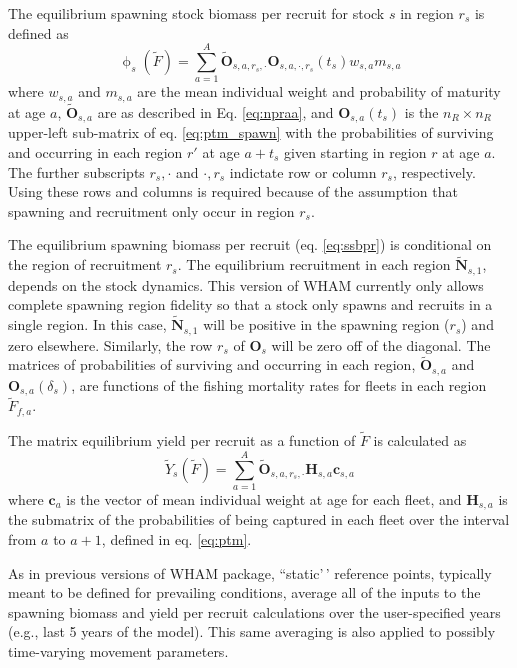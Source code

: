 \documentclass[
]{article}
\begin{document}
The equilibrium spawning stock biomass per recruit for stock \(s\) in
region \(r_s\) is defined as \begin{equation}\label{eq:ssbpr}
 \upphi_s(\widetilde{F}) = \sum^{A}_{a=1} \widetilde{\mathbf{O}}_{s,a,r_s,\cdot} \mathbf{O}_{s,a,\cdot,r_s}(t_s) w_{s,a} m_{s,a}
\end{equation} where \(w_{s,a}\) and \(m_{s,a}\) are the mean individual
weight and probability of maturity at age \(a\),
\(\widetilde{\mathbf{O}}_{s,a}\) are as described in Eq. \ref{eq:npraa},
and \(\mathbf{O}_{s,a}(t_s)\) is the \(n_R \times n_R\) upper-left
sub-matrix of eq. \ref{eq:ptm_spawn} with the probabilities of surviving
and occurring in each region \(r'\) at age \(a+t_s\) given starting in
region \(r\) at age \(a\). The further subscripts \(r_s,\cdot\) and
\(\cdot,r_s\) indictate row or column \(r_s\), respectively. Using these
rows and columns is required because of the assumption that spawning and
recruitment only occur in region \(r_s\).

The equilibrium spawning biomass per recruit (eq. \ref{eq:ssbpr}) is
conditional on the region of recruitment \(r_s\). The equilibrium
recruitment in each region \(\widetilde {\mathbf{N}}_{s,1}\), depends on
the stock dynamics. This version of WHAM currently only allows complete
spawning region fidelity so that a stock only spawns and recruits in a
single region. In this case, \(\widetilde {\mathbf{N}}_{s,1}\) will be
positive in the spawning region (\(r_s\)) and zero elsewhere. Similarly,
the row \(r_s\) of \(\mathbf{O}_s\) will be zero off of the diagonal.
The matrices of probabilities of surviving and occurring in each region,
\(\widetilde{\mathbf{O}}_{s,a}\) and \(\mathbf{O}_{s,a}(\delta_s)\), are
functions of the fishing mortality rates for fleets in each region
\(\widetilde F_{f,a}\).

The matrix equilibrium yield per recruit as a function of
\(\widetilde F\) is calculated as \begin{equation}\label{eq:ypr}
 \widetilde{Y}_s({\widetilde{F}}) = \sum^{A}_{a=1} \widetilde{\mathbf{O}}_{s,a,r_s,\cdot} \mathbf{H}_{s,a} \mathbf{c}_{s,a}
\end{equation} where \(\mathbf{c}_a\) is the vector of mean individual
weight at age for each fleet, and \(\mathbf{H}_{s,a}\) is the submatrix
of the probabilities of being captured in each fleet over the interval
from \(a\) to \(a+1\), defined in eq. \ref{eq:ptm}.

As in previous versions of WHAM package, ``static'\,' reference points,
typically meant to be defined for prevailing conditions, average all of
the inputs to the spawning biomass and yield per recruit calculations
over the user-specified years (e.g., last 5 years of the model). This
same averaging is also applied to possibly time-varying movement
parameters.
\end{document}
